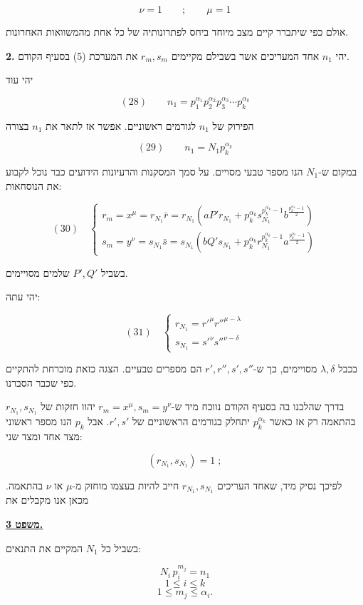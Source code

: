 \[ \nu = 1 \qquad ; \qquad \mu = 1 \]

אולם כפי שיתברר קיים מצב מיוחד ביחס לפתרונותיה של כל אחת מהמשוואות
האחרונות.

\noindent\textbf{2.} יהי $n_1$ אחד המעריכים אשר בשבילם מקיימים $r_m, s_m$ את המערכת
(5) בסעיף הקודם.

יהי עוד

\[ (28) \qquad n_1 = p_1^{\alpha_1}p_2^{\alpha_2}p_3^{\alpha_3}\cdots p_k^{\alpha_k} \]

הפירוק של $n_1$ לגורמים ראשוניים. אפשר אז לתאר את $n_1$ בצורה

\[ (29) \qquad n_1 = N_1 p_k^{\alpha_k} \]

במקום ש-$N_1$ הנו מספר טבעי מסויים. על סמך המסקנות והרעיונות
הידועים כבר נוכל לקבוע את הנוסחאות:

\[ (30) \quad
\begin{cases}
r_m = x^{\mu} = r_{N_1}\bar{r} = r_{N_1}\left(aP'r_{N_1} + p_k^{\alpha_k}s_{N_1}^{p_k^{\alpha_k}-1}
b^{\frac{p_k^{\alpha_k}-1}{2}}\right) \\[6pt]
s_m = y^{\nu} = s_{N_1}\bar{s} = s_{N_1}\left(bQ's_{N_1} + p_k^{\alpha_k}r_{N_1}^{p_k^{\alpha_k}-1}
a^{\frac{p_k^{\alpha_k}-1}{2}}\right)
\end{cases}
\]

בשביל $P', Q'$ שלמים מסויימים.

יהי עתה:

\[ (31) \quad
\begin{cases}
r_{N_1} = r'^{\mu} r''^{\mu-\lambda} \\
s_{N_1} = s'^{\nu} s''^{\nu-\delta}
\end{cases}
\]

בכבל $\lambda, \delta$ מסויימים, כך ש-$r', r'', s', s''$ הם מספרים
טבעיים. הצגה כזאת מוכרחת להתקיים כפי שכבר הסברנו.

בדרך שהלכנו בה בסעיף הקודם נווכח מיד ש-$r_m = x^{\mu}, s_m = y^{\nu}$
יהוו חזקות של $r_{N_1}, s_{N_1}$ בהתאמה רק אז כאשר $p_k^{\alpha_k}$
יתחלק בגורמים הראשוניים של $r', s'$. אבל $p_k$ הנו מספר ראשוני
מצד אחד ומצד שני:

\[ (r_{N_1}, s_{N_1}) = 1 \; ; \]

לפיכך נסיק מיד, שאחד העריכים $r_{N_1}, s_{N_1}$ חייב להיות בעצמו
מוחזק מ-$\mu$ או $\nu$ בהתאמה. מכאן אנו מקבלים את

\noindent\textbf{\underline{משפט 3.}}

בשביל כל $N_1$ המקיים את התנאים:

\[ N_i \, p_i^{m_j} = n_1 \]
\[ 1 \leq i \leq k \]
\[ 1 \leq m_j \leq \alpha_i . \]

